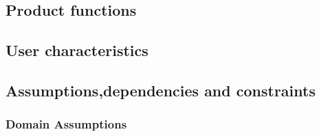 \subsection{Product functions}



\subsection{User characteristics}



\subsection{Assumptions,dependencies and constraints}
\subsubsection{Domain Assumptions}

